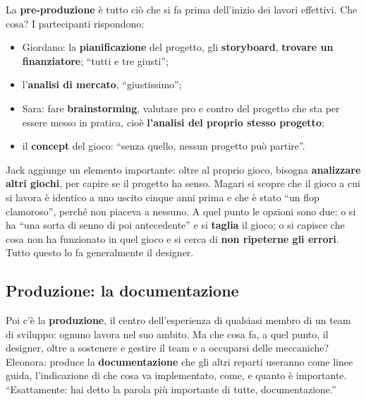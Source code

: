 La \textbf{pre-produzione} è tutto ciò che si fa prima dell'inizio dei
lavori effettivi. Che cosa? I partecipanti rispondono:
\begin{itemize}
  \item Giordano: la \textbf{pianificazione} del progetto, gli
        \textbf{storyboard}, \textbf{trovare un finanziatore}; ``tutti e tre
        giusti'';
  \item l'\textbf{analisi di mercato}, ``giustissimo'';
  \item Sara: fare \textbf{brainstorming}, valutare pro e contro del
        progetto che sta per essere messo in pratica, cioè
        \textbf{l'analisi del proprio stesso progetto};
  \item il \textbf{concept} del gioco: ``senza quello, nessun progetto può
        partire''.
\end{itemize}
Jack aggiunge un elemento importante: oltre al proprio gioco, bisogna
\textbf{analizzare altri giochi}, per capire se il progetto ha senso. Magari
si scopre che il gioco a cui si lavora è identico a uno uscito cinque anni
prima e che è stato ``un flop clamoroso'', perché non piaceva a nessuno. A
quel punto le opzioni sono due: o si ha ``una sorta di senno di poi
antecedente'' e si \textbf{taglia} il gioco; o si capisce che cosa non ha
funzionato in quel gioco e si cerca di \textbf{non ripeterne gli errori}.
Tutto questo lo fa generalmente il designer.

\subsection{Produzione: la documentazione}

Poi c'è la \textbf{produzione}, il centro dell'esperienza di qualsiasi
membro di un team di sviluppo: ognuno lavora nel suo ambito. Ma che cosa fa,
a quel punto, il designer, oltre a sostenere e gestire il team e a occuparsi
delle meccaniche? Eleonora: produce la \textbf{documentazione} che gli altri
reparti useranno come linee guida, l'indicazione di che cosa va
implementato, come, e quanto è importante. ``Esattamente: hai detto la parola
più importante di tutte, documentazione.''

